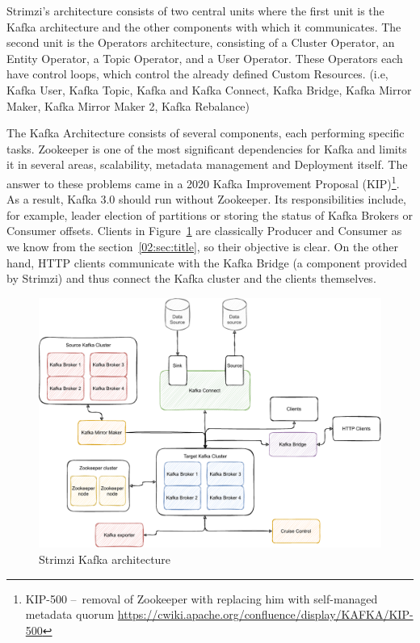 Strimzi's architecture consists of two central units where the first unit is the Kafka architecture and the other components with which it communicates.
The second unit is the Operators architecture, consisting of a Cluster Operator, an Entity Operator, a Topic Operator, and a User Operator.
These Operators each have control loops, which control the already defined Custom Resources. (i.e, Kafka User, Kafka Topic, Kafka and Kafka Connect, Kafka Bridge, Kafka Mirror Maker, Kafka Mirror Maker 2, Kafka Rebalance)

The Kafka Architecture consists of several components, each performing specific tasks.
Zookeeper is one of the most significant dependencies for Kafka and limits it in several areas, scalability, metadata management and Deployment itself.
The answer to these problems came in a 2020 Kafka Improvement Proposal (KIP)\footnote{KIP-500 \---\ removal of Zookeeper with replacing him with self-managed metadata quorum \url{https://cwiki.apache.org/confluence/display/KAFKA/KIP-500}}.
As a result, Kafka 3.0 should run without Zookeeper.
Its responsibilities include, for example, leader election of partitions or storing the status of Kafka Brokers or Consumer offsets.
Clients in Figure~\ref{03:fig:strimziKafkaArchitecture} are classically Producer and Consumer as we know from the section~\ref{02:sec:title}, so their objective is clear.
On the other hand, HTTP clients communicate with the Kafka Bridge (a component provided by Strimzi) and thus connect the Kafka cluster and the clients themselves.
\begin{figure}[!ht]
    \centering
    \includegraphics[scale=0.70]{obrazky-figures/02-preliminaries/03-strimzi/03-strimzi-kafka-architecture (1)}
    \caption{Strimzi Kafka architecture}
    \label{03:fig:strimziKafkaArchitecture}
\end{figure}
